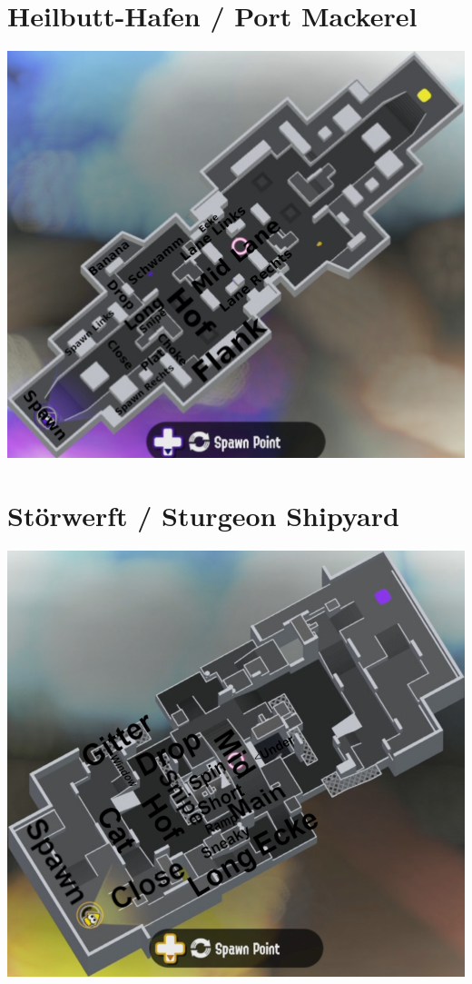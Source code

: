 \documentclass{scrreprt}
\begin{document}
\section{Heilbutt-Hafen / Port Mackerel}
\includegraphics[width=\linewidth]{img/portmackerel.png}
\section{Störwerft / Sturgeon Shipyard}
\includegraphics[width=\linewidth]{img/sturgeonshipyard.png}
\end{document}
